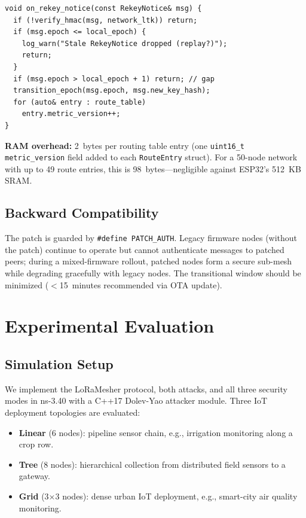 \documentclass[10pt,journal,compsoc]{IEEEtran}
\begin{document}
\begin{lstlisting}[caption={rekeying.cpp — MetricVersion check (18 lines)}]
void on_rekey_notice(const RekeyNotice& msg) {
  if (!verify_hmac(msg, network_ltk)) return;
  if (msg.epoch <= local_epoch) {
    log_warn("Stale RekeyNotice dropped (replay?)");
    return;
  }
  if (msg.epoch > local_epoch + 1) return; // gap
  transition_epoch(msg.epoch, msg.new_key_hash);
  for (auto& entry : route_table)
    entry.metric_version++;
}
\end{lstlisting}

\textbf{RAM overhead:} 2~bytes per routing table entry
(one \texttt{uint16\_t metric\_version} field added to each
\texttt{RouteEntry} struct).
For a 50-node network with up to 49 route entries, this is
98~bytes—negligible against ESP32's 512~KB SRAM.

\subsection{Backward Compatibility}

The patch is guarded by \texttt{\#define PATCH\_AUTH}.
Legacy firmware nodes (without the patch) continue to operate
but cannot authenticate messages to patched peers; during a
mixed-firmware rollout, patched nodes form a secure sub-mesh
while degrading gracefully with legacy nodes. The
transitional window should be minimized ($<$15~minutes
recommended via OTA update).

\section{Experimental Evaluation}
\label{sec:eval}

\subsection{Simulation Setup}

We implement the LoRaMesher protocol, both attacks, and all three
security modes in ns-3.40 with a C++17 Dolev-Yao attacker module.
Three IoT deployment topologies are evaluated:

\begin{itemize}
  \item \textbf{Linear} (6 nodes): pipeline sensor chain, e.g.,
    irrigation monitoring along a crop row.
  \item \textbf{Tree} (8 nodes): hierarchical collection from
    distributed field sensors to a gateway.
  \item \textbf{Grid} (3×3 nodes): dense urban IoT deployment,
    e.g., smart-city air quality monitoring.
\end{itemize}
\end{document}
